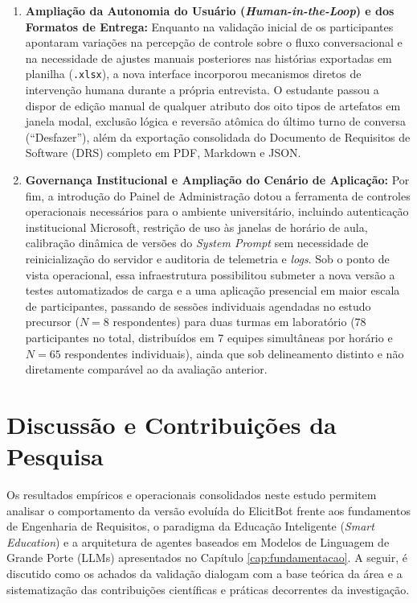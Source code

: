 \begin{enumerate}
    \item \textbf{Ampliação da Autonomia do Usuário (\textit{Human-in-the-Loop}) e dos Formatos de Entrega:} Enquanto na validação inicial de  os participantes apontaram variações na percepção de controle sobre o fluxo conversacional e na necessidade de ajustes manuais posteriores nas histórias exportadas em planilha (\texttt{.xlsx}), a nova interface incorporou mecanismos diretos de intervenção humana durante a própria entrevista. O estudante passou a dispor de edição manual de qualquer atributo dos oito tipos de artefatos em janela modal, exclusão lógica e reversão atômica do último turno de conversa (``Desfazer''), além da exportação consolidada do Documento de Requisitos de Software (DRS) completo em PDF, Markdown e JSON.
    \item \textbf{Governança Institucional e Ampliação do Cenário de Aplicação:} Por fim, a introdução do Painel de Administração dotou a ferramenta de controles operacionais necessários para o ambiente universitário, incluindo autenticação institucional Microsoft, restrição de uso às janelas de horário de aula, calibração dinâmica de versões do \textit{System Prompt} sem necessidade de reinicialização do servidor e auditoria de telemetria e \textit{logs}. Sob o ponto de vista operacional, essa infraestrutura possibilitou submeter a nova versão a testes automatizados de carga e a uma aplicação presencial em maior escala de participantes, passando de sessões individuais agendadas no estudo precursor ($N = 8$ respondentes) para duas turmas em laboratório (78 participantes no total, distribuídos em 7 equipes simultâneas por horário e $N = 65$ respondentes individuais), ainda que sob delineamento distinto e não diretamente comparável ao da avaliação anterior.
\end{enumerate}

\section{Discussão e Contribuições da Pesquisa}
\label{sec:contribuicoes}

Os resultados empíricos e operacionais consolidados neste estudo permitem analisar o comportamento da versão evoluída do ElicitBot frente aos fundamentos de Engenharia de Requisitos, o paradigma da Educação Inteligente (\textit{Smart Education}) e a arquitetura de agentes baseados em Modelos de Linguagem de Grande Porte (LLMs) apresentados no Capítulo \ref{cap:fundamentacao}. A seguir, é discutido como os achados da validação dialogam com a base teórica da área e a sistematização das contribuições científicas e práticas decorrentes da investigação.

